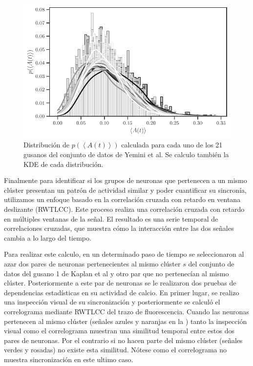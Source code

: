\begin{figure}[h!]
	\centering\includegraphics[width=\imsize]{distactivos.pdf}
	\caption[Distribución de $p(\left\langle A(t) \right\rangle)$    calculada para cada uno de los  21 gusanos del conjunto de datos de Yemini et al.]{Distribución de $p(\left\langle A(t) \right\rangle)$    calculada para cada uno de los  21 gusanos del conjunto de datos de Yemini et al. Se calculo también la KDE de cada distribución.} \label{fig:distactivos}
\end{figure}

Finalmente para identificar si los  grupos de neuronas que pertenecen a un mismo clúster presentan  un patrón de actividad similar y  poder cuantificar su sincronía, utilizamos un enfoque basado en la correlación cruzada con retardo en ventana deslizante  (RWTLCC).  Este proceso realiza una correlación cruzada con retardo en múltiples ventanas de la señal. El resultado es una serie temporal de correlaciones cruzadas, que muestra cómo la interacción entre las dos señales cambia a lo largo del tiempo. 

Para realizar este calculo,  en un determinado paso de tiempo   se seleccionaron  al azar dos pares de neuronas pertenecientes al mismo clúster $s$  del conjunto de datos del gusano 1 de Kaplan et al y otro par que no pertenecían al mismo clúster.   Posteriormente  a este par de neuronas se le realizaron  dos  pruebas de dependencias estadísticas en su actividad de calcio. En primer lugar, se realizo una  inspección visual de su sincronización y posteriormente se   calculó el correlograma mediante  RWTLCC del trazo de fluorescencia. Cuando las neuronas pertenecen al mismo clúster (señales azules y naranjas en la )  tanto la inspección visual como el correlograma muestran una similitud temporal entre estos dos  pares de neuronas. Por el contrario si no hacen parte del mismo clúster (señales verdes y rosadas)  no  existe esta similitud. Nótese como el correlograma no muestra sincronización en este ultimo caso. 


